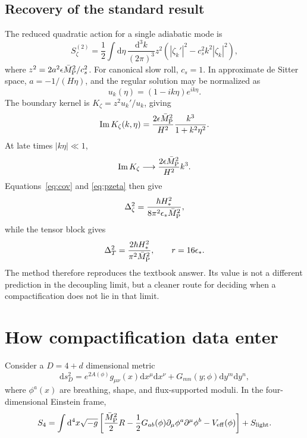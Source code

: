 \documentclass[aps,prd,twocolumn,superscriptaddress,nofootinbib,longbibliography]{revtex4-2}
\newcommand{\Mpl}{\bar M_{\rm P}}
\newcommand{\dd}{\mathrm d}
\begin{document}
\subsection{Recovery of the standard result}
The reduced quadratic action for a single adiabatic mode is
\begin{equation}
S_\zeta^{(2)}=\frac12\int\dd\eta\,\frac{\dd^3k}{(2\pi)^3}z^2
\left(|\zeta_k'|^2-c_s^2k^2|\zeta_k|^2\right),
\end{equation}
where $z^2=2a^2\epsilon\Mpl^2/c_s^2$. For canonical slow roll, $c_s=1$. In approximate de Sitter space, $a=-1/(H\eta)$, and the regular solution may be normalized as
\begin{equation}
u_k(\eta)=(1-ik\eta)e^{ik\eta}.
\end{equation}
The boundary kernel is $K_\zeta=z^2u_k'/u_k$, giving
\begin{equation}
\operatorname{Im}K_\zeta(k,\eta)=
\frac{2\epsilon\Mpl^2}{H^2}\frac{k^3}{1+k^2\eta^2}.
\end{equation}
At late times $|k\eta|\ll1$,
\begin{equation}
\operatorname{Im}K_\zeta\longrightarrow
\frac{2\epsilon\Mpl^2}{H^2}k^3.
\end{equation}
Equations~\eqref{eq:cov} and \eqref{eq:pzeta} then give
\begin{equation}
\Delta_\zeta^2=\frac{\hbar H_*^2}{8\pi^2\epsilon_*\Mpl^2},
\end{equation}
while the tensor block gives
\begin{equation}
\Delta_T^2=\frac{2\hbar H_*^2}{\pi^2\Mpl^2},\qquad r=16\epsilon_*.
\end{equation}
The method therefore reproduces the textbook answer. Its value is not a different prediction in the decoupling limit, but a cleaner route for deciding when a compactification does not lie in that limit.

\section{How compactification data enter}
\label{sec:compactification}

Consider a $D=4+d$ dimensional metric
\begin{equation}
\dd s_D^2=e^{2A(\phi)}g_{\mu\nu}(x)\dd x^\mu\dd x^\nu+G_{mn}(y;\phi)\dd y^m\dd y^n,
\end{equation}
where $\phi^a(x)$ are breathing, shape, and flux-supported moduli. In the four-dimensional Einstein frame,
\begin{equation}
S_4=\int\dd^4x\sqrt{-g}\left[\frac{\Mpl^2}{2}R-
\frac12G_{ab}(\phi)\partial_\mu\phi^a\partial^\mu\phi^b-V_{\rm eff}(\phi)\right]+S_{\rm light}.
\label{eq:einstframe}
\end{equation}
\end{document}
